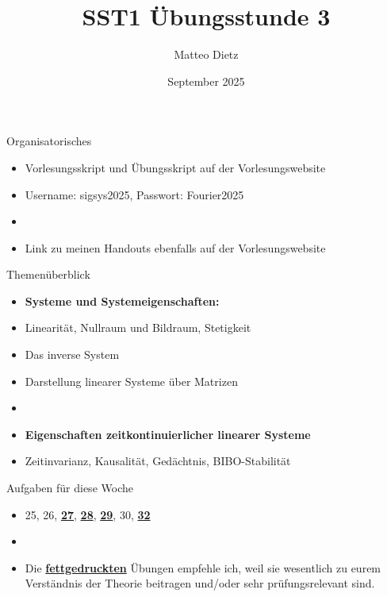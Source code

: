 \documentclass[14pt, aspectratio=169, handout]{beamer}
\title{SST1 Übungsstunde 3}
\author{Matteo Dietz}
\date{September 2025}
\begin{document}
\maketitle

\begin{frame}{Organisatorisches}
    \begin{itemize}
        \item Vorlesungsskript und Übungsskript auf der Vorlesungswebsite
        \item[] Username: sigsys2025, \hspace{10pt} Passwort: Fourier2025
        \item[] 
        \item Link zu meinen Handouts ebenfalls auf der Vorlesungswebsite
    \end{itemize}
\end{frame}

\begin{frame}{Themenüberblick}
    \begin{itemize}
        \item \textbf{Systeme und Systemeigenschaften:}
        \item[] Linearität, Nullraum und Bildraum, Stetigkeit
        \item[] Das inverse System
        \item[] Darstellung linearer Systeme über Matrizen
        \item[] 
        \item \textbf{Eigenschaften zeitkontinuierlicher linearer Systeme}
        \item[] Zeitinvarianz, Kausalität, Gedächtnis, BIBO-Stabilität
    \end{itemize}
\end{frame}

\begin{frame}{Aufgaben für diese Woche}
    \begin{itemize}
        \item[] 25, 26, \underline{\textbf{27}}, \underline{\textbf{28}}, \underline{\textbf{29}}, 30, \underline{\textbf{32}}
        \item[] 
        \item[] Die \underline{\textbf{fettgedruckten}} Übungen empfehle ich, weil sie wesentlich zu eurem Verständnis der Theorie beitragen und/oder sehr prüfungsrelevant sind.
    \end{itemize}
\end{frame}
\end{document}
